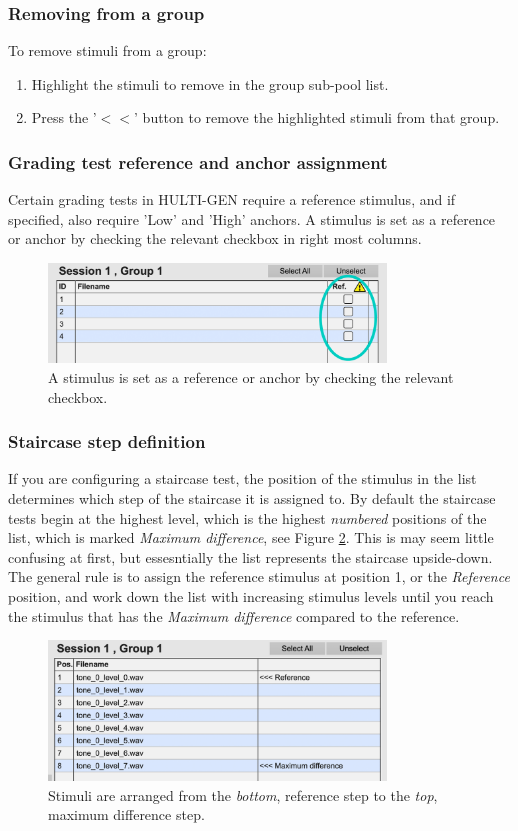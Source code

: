 \subsubsection{Removing from a group}
To remove stimuli from a group:
\begin{enumerate}
	\item Highlight the stimuli to remove in the group sub-pool list.
	\item Press the '$<<$' button to remove the highlighted stimuli from that group.
\end{enumerate}

\subsubsection{Grading test reference and anchor assignment}
Certain grading tests in HULTI-GEN require a reference stimulus, and if specified, also require 'Low' and 'High' anchors. A stimulus is set as a reference or anchor by checking the relevant checkbox in right most columns.

\begin{figure}[ht]
	\centering
	\includegraphics[width=0.8\textwidth]{./images/createTest_step06_anchorCheck.png}
	\caption{A stimulus is set as a reference or anchor by checking the relevant checkbox.}
	\label{create::stimulusAssignCheck}
\end{figure}

\subsubsection{Staircase step definition}
If you are configuring a staircase test, the position of the stimulus in the list determines which step of the staircase it is assigned to. By default the staircase tests begin at the highest level, which is the highest \emph{numbered} positions of the list, which is marked \emph{Maximum difference}, see Figure \ref{create::staircase}. This is may seem little confusing at first, but essesntially the list represents the staircase upside-down. The general rule is to assign the reference stimulus at position 1, or the \emph{Reference} position, and work down the list with increasing stimulus levels until you reach the stimulus that has the \emph{Maximum difference} compared to the reference.

\begin{figure}[ht]
	\centering
	\includegraphics[width=0.8\textwidth]{./images/createTest_step06_staircase.png}
	\caption{Stimuli are arranged from the \emph{bottom}, reference step to the \emph{top}, maximum difference step.}
	\label{create::staircase}
\end{figure}

